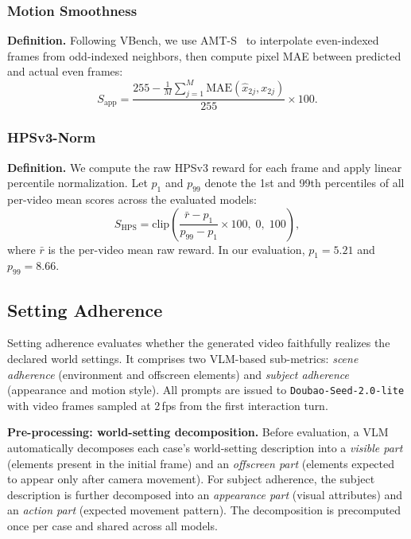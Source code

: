 \documentclass{llmxive}
\providecommand{\myparagraph}[1]{\vspace{-0.1em}\noindent\textbf{#1}\hspace{0.3em}}
\begin{document}
\subsubsection{Motion Smoothness}
\label{app:smoothness_detail}

\myparagraph{Definition.}
Following VBench, we use AMT-S~\cite{li2023amt} to interpolate even-indexed frames from odd-indexed neighbors, then compute pixel MAE between predicted and actual even frames:
\begin{equation}
  S_{\mathrm{app}} = \frac{255 - \frac{1}{M}\sum_{j=1}^{M}\text{MAE}(\hat{x}_{2j}, x_{2j})}{255} \times 100.
\end{equation}

\subsubsection{HPSv3-Norm}
\label{app:hps_detail}

\myparagraph{Definition.}
We compute the raw HPSv3 reward for each frame and apply linear percentile normalization. Let $p_1$ and $p_{99}$ denote the 1st and 99th percentiles of all per-video mean scores across the evaluated models:
\begin{equation}
  S_{\text{HPS}} = \text{clip}\!\left(\frac{\bar{r} - p_1}{p_{99} - p_1} \times 100,\; 0,\; 100\right),
\end{equation}
where $\bar{r}$ is the per-video mean raw reward. In our evaluation, $p_1 = 5.21$ and $p_{99} = 8.66$.

\subsection{Setting Adherence}
\label{app:setting_detail}

Setting adherence evaluates whether the generated video faithfully realizes the declared world settings.
It comprises two VLM-based sub-metrics: \emph{scene adherence} (environment and offscreen elements) and \emph{subject adherence} (appearance and motion style).
All prompts are issued to \texttt{Doubao-Seed-2.0-lite} with video frames sampled at 2\,fps from the first interaction turn.

\myparagraph{Pre-processing: world-setting decomposition.}
Before evaluation, a VLM automatically decomposes each case's world-setting description into a \emph{visible part} (elements present in the initial frame) and an \emph{offscreen part} (elements expected to appear only after camera movement).
For subject adherence, the subject description is further decomposed into an \emph{appearance part} (visual attributes) and an \emph{action part} (expected movement pattern).
The decomposition is precomputed once per case and shared across all models.
\end{document}
